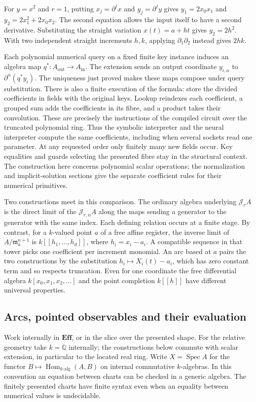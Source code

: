 \documentclass[11pt,a4paper]{article}
\theoremstyle{definition}
\theoremstyle{remark}\newaliascnt{remark}{theorem}
\newcommand{\E}{\mathbf{Eff}}
\newcommand{\Q}{\mathbb Q}
\newcommand{\Hom}{\operatorname{Hom}}
\numberwithin{equation}{section}
\begin{document}
For $y=x^2$ and $r=1$, putting $x_j=\partial^j x$ and $y_j=\partial^j y$ gives $y_1=2x_0x_1$ and $y_2=2x_1^2+2x_0x_2$. The second equation allows the input itself to have a second derivative. Substituting the straight variation $x(t)=a+ht$ gives $y_2=2h^2$. With two independent straight increments $h,k$, applying $\partial_1\partial_2$ instead gives $2hk$.

Each polynomial numerical query on a fixed finite key instance induces an algebra map $q^*:A_{\mathrm{out}}\to A_{\mathrm{in}}$. The extension sends an output coordinate $y_{i,\alpha}$ to $\partial^\alpha(q^*y_i)$. The uniqueness just proved makes these maps compose under query substitution. There is also a finite execution of the formula: store the divided coefficients in fields with the original keys. Lookup reindexes each coefficient, a grouped sum adds the coefficients in its fibre, and a product takes their convolution. These are precisely the instructions of the compiled circuit over the truncated polynomial ring. Thus the symbolic interpreter and the neural interpreter compute the same coefficients, including when several sockets read one parameter. At any requested order only finitely many new fields occur. Key equalities and guards selecting the presented fibre stay in the structural context. The construction here concerns polynomial scalar operations; the normalization and implicit-solution sections give the separate coefficient rules for their numerical primitives.

Two constructions meet in this comparison. The ordinary algebra underlying $\mathcal J_r A$ is the direct limit of the $\mathcal J_{r,n} A$ along the maps sending a generator to the generator with the same index. Each defining relation occurs at a finite stage. By contrast, for a $k$-valued point $a$ of a free affine register, the inverse limit of $A/\mathfrak m_a^{n+1}$ is $k[[h_1,\ldots,h_d]]$, where $h_i=x_i-a_i$. A compatible sequence in that tower picks one coefficient per increment monomial. An arc based at $a$ pairs the two constructions by the substitution $h_i\mapsto X_i(t)-a_i$, which has zero constant term and so respects truncation. Even for one coordinate the free differential algebra $k[x_0,x_1,x_2,\ldots]$ and the point completion $k[[h]]$ have different universal properties.

\subsection{Arcs, pointed observables and their evaluation}
Work internally in $\E$, or in the slice over the presented shape. For the relative geometry take $k=\Q$ internally; the constructions below commute with scalar extension, in particular to the located real ring. Write $X=\operatorname{Spec}A$ for the functor $B\mapsto\Hom_{k\text{-alg}}(A,B)$ on internal commutative $k$-algebras. In this convention an equation between charts can be checked in a generic algebra. The finitely presented charts have finite syntax even when an equality between numerical values is undecidable.
\end{document}
